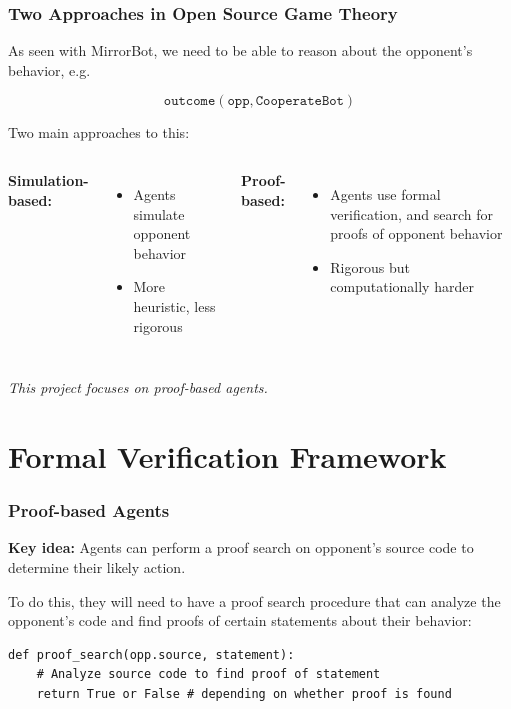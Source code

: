 \documentclass[t,11pt]{beamer}
\begin{document}
\begin{frame}[fragile]
  \frametitle{Two Approaches in Open Source Game Theory}
  
  As seen with MirrorBot, we need to be able to reason about the opponent's behavior, e.g. 

  \[\texttt{outcome}(\texttt{opp}, \texttt{CooperateBot})\]

  \vspace{0.6cm}

  Two main approaches to this:

  \begin{columns}[T]
    \textbf{Simulation-based:}
    \begin{itemize}
      \item Agents simulate opponent behavior
      \item More heuristic, less rigorous
    \end{itemize}
    
    \textbf{Proof-based:}
    \begin{itemize}
      \item Agents use formal verification, and search for proofs of opponent behavior
      \item Rigorous but computationally harder
    \end{itemize}
  \end{columns}
  
  \vspace{0.5cm}
  
  \small\textit{This project focuses on proof-based agents.}
\end{frame}

\section{Formal Verification Framework}
\begin{frame}[fragile]
  \frametitle{Proof-based Agents}
  \textbf{Key idea:} Agents can perform a proof search on opponent's source code to determine their likely action.

  To do this, they will need to have a proof search procedure that can analyze the opponent's code and find proofs of certain statements about their behavior:
  \vspace{0.3cm}
  \begin{center}
    \begin{lstlisting}
def proof_search(opp.source, statement):
    # Analyze source code to find proof of statement
    return True or False # depending on whether proof is found
    \end{lstlisting}
  \end{center}
\end{frame}
\end{document}
